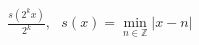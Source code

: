 \documentclass[preview]{standalone}
\begin{document}
\begin{align*}
\frac{s(2^k x)}{2^k}, \text{  }s(x) = \min_{n \in \mathbb{Z}} |x - n|
\end{align*}
\end{document}

